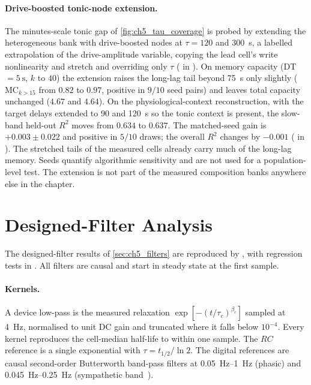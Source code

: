 \paragraph{Drive-boosted tonic-node extension.} The minutes-scale tonic gap of
\cref{fig:ch5_tau_coverage} is probed by extending the heterogeneous bank with
drive-boosted nodes at $\tau = 120$ and \SI{300}{\second}, a labelled
extrapolation of the drive-amplitude variable, copying the lead cell's write
nonlinearity and stretch and overriding only $\tau$ ( in
). On memory capacity (DT $=\SI{5}{\second}$, $k$ to $40$)
the extension raises the long-lag tail beyond \SI{75}{\second} only slightly
($\mathrm{MC}_{k>15}$ from $0.82$ to $0.97$, positive in $9/10$ seed pairs) and leaves total
capacity unchanged ($4.67$ and $4.64$). On the physiological-context reconstruction, with the
target delays extended to $90$ and \SI{120}{\second} so the tonic context is
present, the slow-band held-out $R^2$ moves from $0.634$ to $0.637$.
The matched-seed gain is $+0.003\pm0.022$ and positive in $5/10$ draws; the overall
$R^2$ changes by $-0.001$ ( in ). The
stretched tails of the measured cells already carry much of the long-lag memory. Seeds quantify algorithmic sensitivity and are not used for a population-level test. The
extension is not part of the measured composition banks anywhere else in the chapter.

\section{Designed-Filter Analysis}\label{app:ch5_filters}

The designed-filter results of \cref{sec:ch5_filters} are reproduced by
, with regression tests in
. All filters are causal and start in
steady state at the first sample.

\paragraph{Kernels.} A device low-pass is the measured relaxation
\(\exp[-(t/\tau_c)^{\beta_c}]\) sampled at \SI{4}{\hertz}, normalised to unit DC
gain and truncated where it falls below \(10^{-4}\). Every kernel reproduces the
cell-median half-life to within one sample. The $RC$ reference is a single
exponential with \(\tau=t_{1/2}/\ln 2\). The digital references are causal
second-order Butterworth band-pass filters at \SIrange{0.05}{1}{\hertz} (phasic)
and \SIrange{0.045}{0.25}{\hertz} (sympathetic band~\cite{PosadaQuintero2016EDASymp}).

